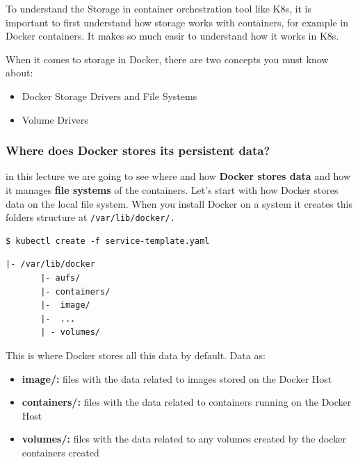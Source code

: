 \documentclass{article}
\newenvironment{codetemplate}[1][]{%
  \mybasecolorbox[#1]
  \itshape
}{%
  \endmybasecolorbox
}
\begin{document}
To understand the Storage in container orchestration tool like K8s, it is important to first understand how storage works with containers, for example in Docker containers. It makes so much easir to understand how it works in K8s.

When it comes to storage in Docker, there are two concepts you must know about:
\begin{itemize}
    \item Docker Storage Drivers and File Systems
    \item Volume Drivers
\end{itemize}

\subsubsection{Where does Docker stores its persistent data?}

in this lecture we are going to see where and how \textbf{Docker stores data} and how it manages \textbf{file systems} of the containers. Let's start with how Docker stores data on the local file system. When you install Docker on a system it creates this folders structure at \verb|/var/lib/docker/.|

\begin{codetemplate}{}
\begin{verbatim}
$ kubectl create -f service-template.yaml
\end{verbatim}
\end{codetemplate}\begin{codetemplate}{}
\begin{verbatim}
|- /var/lib/docker
       |- aufs/
       |- containers/
       |-  image/
       |-  ...
       | - volumes/
\end{verbatim}
\end{codetemplate}

This is where Docker stores all this data by default. Data as:

\begin{itemize}
    \item\textbf{image/:}  files with the data related to images stored on the Docker Host
    \item \textbf{containers/:} files with the data related to containers running on the Docker Host
    \item \textbf{volumes/:} files with the data related to any volumes created by the docker containers created
\end{itemize}
\end{document}
